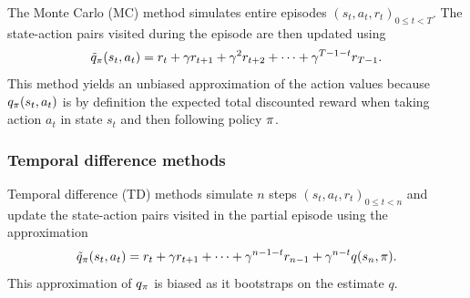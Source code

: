 The Monte Carlo (MC) method simulates entire episodes $(s_t, a_t, r_t)_{0 \leq t < T}$. The state-action pairs visited during the episode are then updated using
\begin{align}
    \Tilde{q}_\pi(s_t, a_t) = r_t + \gamma r_{t+1} + \gamma^2 r_{t+2} + \dots + \gamma^{T-1-t} r_{T-1} .
\end{align}
% 
This method yields an unbiased approximation of the action values
because $q_\pi(s_t,a_t)$ is by definition the expected total discounted reward when taking action $a_t$ in state $s_t$ and then following policy $\pi$.



\subsubsection{Temporal difference methods}

Temporal difference (TD) methods simulate $n$ steps $(s_t, a_t, r_t)_{0 \leq t < n}$ and 
update the state-action pairs visited in the partial episode using the approximation
\begin{align}
\label{eq: nstep approx}
    \Tilde{q}_\pi(s_t, a_t) = r_t + \gamma r_{t+1} + \dots + \gamma^{n-1-t} r_{n-1} + \gamma^{n-t} q(s_{n}, \pi) .
\end{align}
This approximation of $q_\pi$ is biased as it bootstraps on the estimate $q$.


